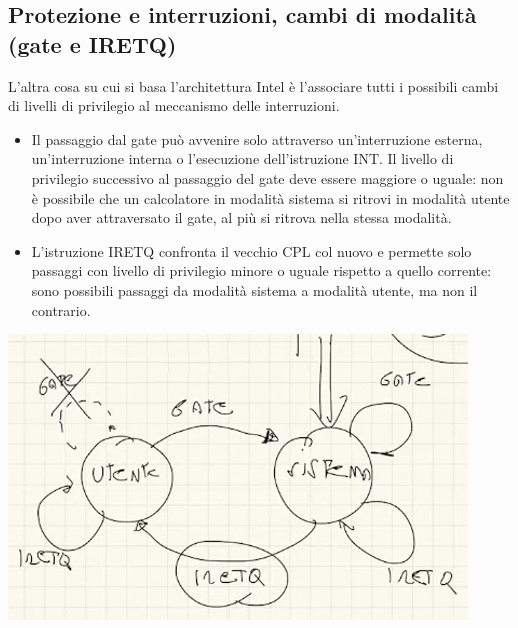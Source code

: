 \documentclass[11pt]{report}
\theoremstyle{definition}
\begin{document}
\subsection{Protezione e interruzioni, cambi di modalità (gate e IRETQ)} L'altra cosa su cui si basa l'architettura Intel è l'associare tutti i possibili cambi di livelli di privilegio al meccanismo delle interruzioni.
\begin{itemize}
	\item Il passaggio dal gate può avvenire solo attraverso un'interruzione esterna, un'interruzione interna o l'esecuzione dell'istruzione INT. Il livello di privilegio successivo al passaggio del gate deve essere maggiore o uguale: non è possibile che un calcolatore in modalità sistema si ritrovi in modalità utente dopo aver attraversato il gate, al più si ritrova nella stessa modalità. 
	\item L'istruzione IRETQ confronta il vecchio CPL col nuovo e permette solo passaggi con livello di privilegio minore o uguale rispetto a quello corrente: sono possibili passaggi da modalità sistema a modalità utente, ma non il contrario. 
\end{itemize}
\begin{center}\includegraphics[scale=.75]{img/120.PNG}\end{center}
\end{document}
